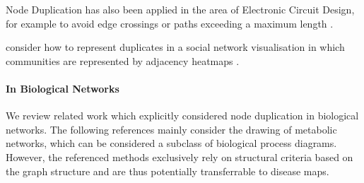 \documentclass[
	fontsize=10pt, %
	twoside=false, %
	secnumdepth=1, %
  toc=indentunnumbered %
]{kaobook}
\begin{document}
Node Duplication has also been applied in the area of Electronic Circuit Design,
for example to avoid edge crossings \cite{li_EliminateWireCrossings_2008} or
paths exceeding a maximum length
\cite{paik_VertexSplittingDags_1998, mayer_GeneticAlgorithmsVertex_1993}.

\citeauthor{henr_ImprovingReadabilityClustered_2008}
 consider how to represent
duplicates in a social network visualisation in which communities are
represented by adjacency heatmaps
\cite{henr_ImprovingReadabilityClustered_2008}.


\paragraph{In Biological Networks} We review related work which explicitly
considered node duplication in biological networks. The following references
mainly consider the drawing of metabolic networks, which can be considered a
subclass of biological process diagrams. However, the referenced
methods exclusively rely on structural criteria based on the graph structure and
are thus potentially transferrable to disease maps.


%

\end{document}
